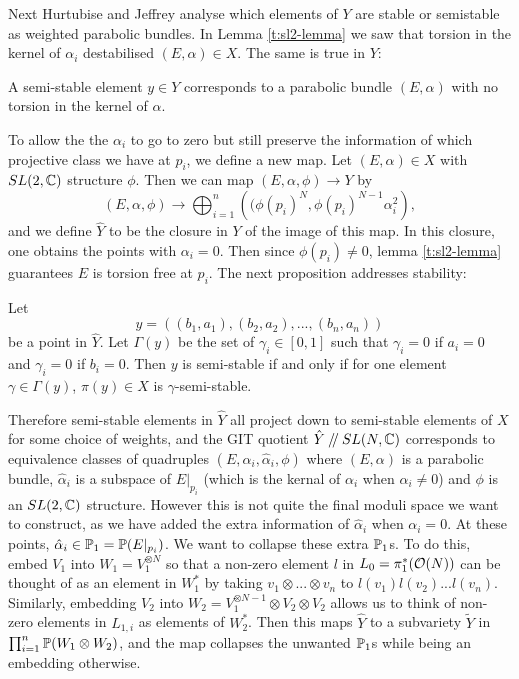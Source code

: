 	Next Hurtubise and Jeffrey analyse which elements of $Y$ are stable or semistable as weighted parabolic bundles. In Lemma \ref{t:sl2-lemma} we saw that torsion in the kernel of $\alpha_i$ destabilised $(E,\alpha) \in X$. The same is true in $Y$:
	\begin{lemma}
		A semi-stable element $y\in Y$ corresponds to a parabolic bundle $(E,\alpha)$ with no torsion in the kernel of $\alpha$.
	\end{lemma}
	To allow the the $\alpha_i$ to go to zero but still preserve the information of which projective class we have at $p_i$, we define a new map. Let $(E,\alpha)\in X$ with $SL(2,\mathbb{C})$ structure $\phi$. Then we can map $(E,\alpha,\phi)\to Y$ by
	\begin{equation}
		(E,\alpha,\phi) \to \bigoplus_{i=1}^n\left(
		(\phi(p_i)^N, \phi(p_i)^{N-1}\alpha_i^2
		\right),
	\end{equation}
	and we define $\hat{Y}$ to be the closure in $Y$ of the image of this map. In this closure, one obtains the points with $\alpha_i =0$. Then since $\phi(p_i)\neq 0$, lemma \ref{t:sl2-lemma} guarantees $E$ is torsion free at $p_i$. The next proposition addresses stability:
	\begin{theorem}
		Let 
		\begin{equation}
			y = \left(
			(b_1, a_1), (b_2, a_2),...,(b_n, a_n)
			\right)
		\end{equation}
		be a point in $\hat{Y}$. Let $\Gamma(y)$ be the set of $\gamma_i \in [0,1]$ such that $\gamma_i =0$ if $a_i =0$ and $\gamma_i = 0$ if $b_i = 0$. Then $y$ is semi-stable if and only if for one element $\gamma \in \Gamma(y)$, $\pi(y)\in X$ is $\gamma$-semi-stable.
	\end{theorem}
	Therefore semi-stable elements in $\hat{Y}$ all project down to semi-stable elements of $X$ for some choice of weights, and the GIT quotient $\hat{Y}\mathbin{/\mkern-4mu/} SL(N,\mathbb{C})$ corresponds to equivalence classes of quadruples $(E,\alpha_i, \hat{\alpha}_i, \phi)$ where $(E,\alpha)$ is a parabolic bundle, $\hat{\alpha}_i$ is a subspace of $E|_{p_i}$ (which is the kernal of $\alpha_i$ when $\alpha_i \neq 0$) and $\phi$ is an $SL(2,\mathbb{C})$ structure. However this is not quite the final moduli space we want to construct, as we have added the extra information of $\hat{\alpha}_i$ when $\alpha_i = 0$. At these points, $\hat{\alpha}_i \in \mathbb{P}_1=\mathbb{P}(E|_{p_i})$. We want to collapse these extra $\mathbb{P}_1$s. To do this, embed $V_1$ into $W_1 = V_1^{\otimes N}$ so that a non-zero element $l$ in $L_{0} = \pi_1^\ast(\mathcal{O}(N))$ can be thought of as an element in $W_1^\ast$ by taking $v_1\otimes...\otimes v_n$ to $l(v_1)l(v_2)...l(v_n)$. Similarly, embedding $V_2$ into $W_2 = V_1^{\otimes N-1}\otimes V_2\otimes V_2$ allows us to think of non-zero elements in $L_{1,i}$ as elements of $W_2^\ast$. Then this maps $\hat{Y}$ to a subvariety $\tilde{Y}$ in $\prod_{i=1}^n \mathbb{P}(W_1\otimes W_2)$, and the map collapses the unwanted $\mathbb{P}_1$s while being an embedding otherwise. 
	
